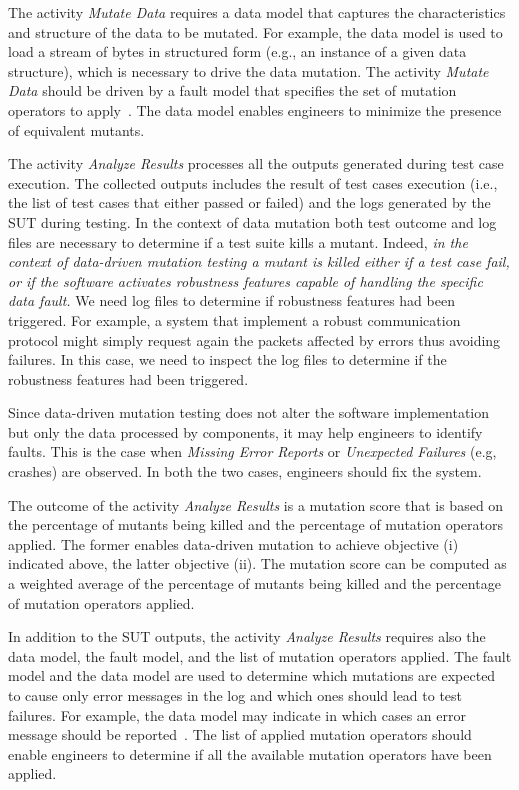 The activity \emph{Mutate Data} requires a data model that captures the characteristics and structure of the data to be mutated. 
For example, the data model is used to load a stream of bytes in structured form (e.g., an instance of a given data structure), which is necessary to drive the data mutation. 
The activity \emph{Mutate Data} should be driven by a fault model that specifies the set of mutation operators to apply~\cite{di2015generating}. 
The data model enables engineers to minimize the presence of equivalent mutants.


The activity \emph{Analyze Results} processes all the outputs generated during test case execution.
The collected outputs includes the result of test cases execution (i.e., the list of test cases that either passed or failed) and the logs generated by the SUT during testing.
In the context of data mutation both test outcome and log files are necessary to determine if a test suite kills a mutant.
Indeed, \emph{in the context of data-driven mutation testing a mutant is killed either if a test case fail, or if the software activates robustness features capable of handling the specific data fault.}
We need log files to determine if robustness features had been triggered.
For example, a system that implement a robust communication protocol might simply request again the packets affected by errors thus avoiding failures. In this case, we need to inspect the log files to determine if the robustness features had been triggered.

Since data-driven mutation testing does not alter the software implementation but only the data processed by components, it may help engineers to identify faults. 
This is the case when \emph{Missing Error Reports} or \emph{Unexpected Failures }(e.g, crashes) are observed. In both the two cases, engineers should fix the system.

The outcome of the activity \emph{Analyze Results} is a mutation score that is based on
the percentage of mutants being killed and the percentage of mutation operators applied. 
The former enables data-driven mutation to achieve objective (i) indicated above, the latter objective (ii). 
The mutation score can be computed as a weighted average of the percentage of mutants being killed and the percentage of mutation operators applied.

In addition to the SUT outputs, the activity \emph{Analyze Results} requires also the data model, the fault model, and the list of mutation operators applied. 
The fault model and the data model are used to determine which mutations are expected to cause only error messages in the log and which ones should lead to test failures.
For example, the data model may indicate in which cases an error message should be reported~\cite{di2015generating}.
The list of applied mutation operators should enable engineers to determine if all the available mutation operators have been applied.






